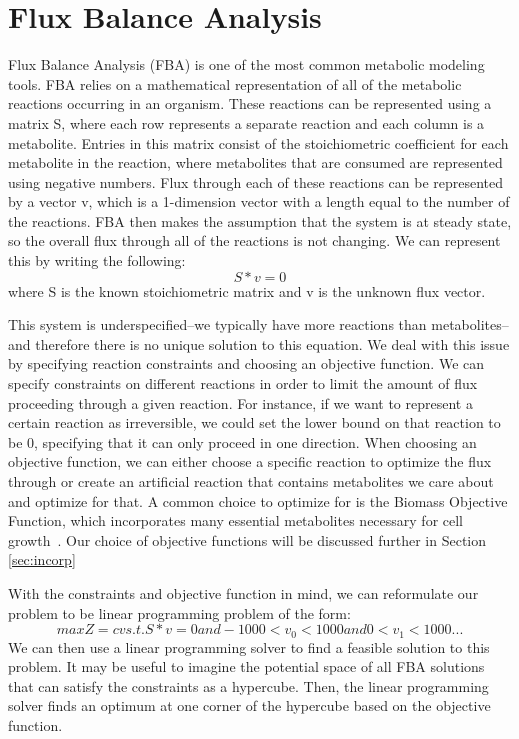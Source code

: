\section{Flux Balance Analysis}
Flux Balance Analysis (FBA) is one of the most common metabolic modeling tools.
FBA relies on a mathematical representation of all of the metabolic reactions occurring in an organism.
These reactions can be represented using a matrix S, where each row represents a separate reaction and each column is a metabolite.
Entries in this matrix consist of the stoichiometric coefficient for each metabolite in the reaction, where metabolites that are consumed are represented using negative numbers.
Flux through each of these reactions can be represented by a vector v, which is a 1-dimension vector with a length equal to the number of the reactions.
FBA then makes the assumption that the system is at steady state, so the overall flux through all of the reactions is not changing.
We can represent this by writing the following:
\begin{equation}
S * v = 0
\end{equation}
where S is the known stoichiometric matrix and v is the unknown flux vector.

This system is underspecified--we typically have more reactions than metabolites--and therefore there is no unique solution to this equation.
We deal with this issue by specifying reaction constraints and choosing an objective function.
We can specify constraints on different reactions in order to limit the amount of flux proceeding through a given reaction.
For instance, if we want to represent a certain reaction as irreversible, we could set the lower bound on that reaction to be 0, specifying that it can only proceed in one direction.
When choosing an objective function, we can either choose a specific reaction to optimize the flux through or create an artificial reaction that contains metabolites we care about and optimize for that.
A common choice to optimize for is the Biomass Objective Function, which incorporates many essential metabolites necessary for cell growth~\cite{feist2010biomass}.
Our choice of objective functions will be discussed further in Section \ref{sec:incorp}

With the constraints and objective function in mind, we can reformulate our problem to be linear programming problem of the form:
\begin{equation}
max Z = cv
s.t. S * v = 0
and -1000 < v_0 < 1000
and 0 < v_1 < 1000
...
\end{equation}
We can then use a linear programming solver to find a feasible solution to this problem.
It may be useful to imagine the potential space of all FBA solutions that can satisfy the constraints as a hypercube.
Then, the linear programming solver finds an optimum at one corner of the hypercube based on the objective function.

